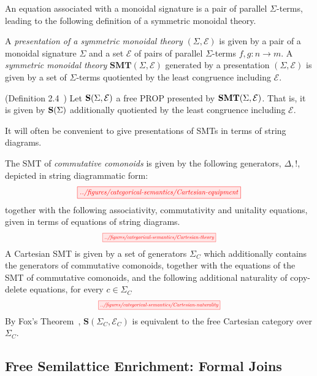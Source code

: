 An equation associated with a monoidal signature is a pair of parallel $\Sigma$-terms, leading to the following definition of a symmetric monoidal theory. 
\begin{definition}
A \textit{presentation of a symmetric monoidal theory} $(\Sigma, \mathcal{E})$ is given by a pair of a monoidal signature $\Sigma$ and a set $\mathcal{E}$ of pairs of parallel $\Sigma$-terms $f,g: n \to m$.
A \textit{symmetric monoidal theory} $\textbf{SMT}(\Sigma,\mathcal{E})$ generated by a presentation $(\Sigma, \mathcal{E})$ is given by a set of $\Sigma$-terms quotiented by the least congruence including $\mathcal{E}$.
\end{definition}

\begin{definition}(Definition 2.4~\cite{bonchi_string_2022-1})
Let $\mathbf{S}(\Sigma, \mathcal{E})$ a free PROP presented by $\mathbf{SMT}(\Sigma, \mathcal{E})$.
That is, it is given by $\mathbf{S}(\Sigma)$ additionally quotiented by the least congruence including $\mathcal{E}$.
\end{definition}

It will often be convenient to give presentations of SMTs in terms of string diagrams.
\begin{example}
The SMT of \textit{commutative comonoids} is given by the following generators, ${\Delta, !}$, depicted in string diagrammatic form:
\[
	\scalebox{0.8}{
  	 \tikzfig{../figures/categorical-semantics/Cartesian-equipment}
	}
\]
together with the following associativity, commutativity and unitality equations, given in terms of equations of string diagrams. 
\[
	\scalebox{0.6}{
	\tikzfig{../figures/categorical-semantics/Cartesian-theory}	
	}
\]
A Cartesian SMT is given by a set of generators $\Sigma_C$ which additionally contains the generators of commutative comonoids, together with the equations of the SMT of commutative comonoids, and the following additional naturality of copy-delete equations, for every $c \in \Sigma_C$
\[
	\scalebox{0.6}{
	\tikzfig{../figures/categorical-semantics/Cartesian-naturality}
	}
\]
By Fox's Theorem~\cite{fox},  $\textbf{S}(\Sigma_C, \mathcal{E}_C)$ is equivalent to the free Cartesian category over $\Sigma_C$. 
\end{example}

\subsection{Free Semilattice Enrichment: Formal Joins}

